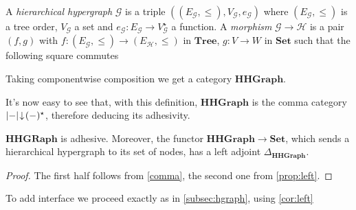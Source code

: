 \documentclass[runningheads,envcountsect]{lmcs}
\newcommand{\catname}[1]{\mathbf{#1}}
\newcommand{\comma}[2]{#1\hspace{1pt} {\downarrow}\hspace{1pt} #2}
\newcommand{\tree}{\catname{Tree}}
\theoremstyle{plain}
\theoremstyle{definition}
\begin{document}
\begin{defi}A \emph{hierarchical hypergraph} $\mathcal{G}$ is a triple $((E_\mathcal{G}, \leq), V_\mathcal{G}, e_\mathcal{G})$ where $(E_\mathcal{G}, \leq)$ is a tree order, $V_\mathcal{G}$ a set and $e_\mathcal{G}:E_\mathcal{G}\rightarrow V_\mathcal{G}^{\star}$ a function. A \emph{morphism} $\mathcal{G}\rightarrow \mathcal{H}$  is a pair $(f,g)$ with $f:(E_\mathcal{G}, \leq)\rightarrow (E_\mathcal{H}, \leq)$ in $\tree$, $g:V\rightarrow W$ in $\catname{Set}$ such that the following square commutes
	\begin{center}
	\end{center}
Taking componentwise composition we get a category $\catname{HHGraph}$.
\end{defi}
It's now easy to see that, with this definition, $\catname{HHGraph}$ is the comma category $\comma{\abs{-}}{(-)^{\star}}$, therefore deducing its adhesivity.
\begin{thm}
	$\catname{HHGRaph}$ is adhesive. Moreover, the functor $\catname{HHGraph}\to \catname{Set}$, which sends a hierarchical hypergraph to its set of nodes, has a left adjoint $\Delta_{\catname{HHGraph}}$.
\end{thm}
\begin{proof}The first half follows from \cref{comma}, the second one from \cref{prop:left}.
\end{proof}

To add interface we proceed exactly as in \cref{subsec:hgraph}, using \cref{cor:left}
\end{document}
